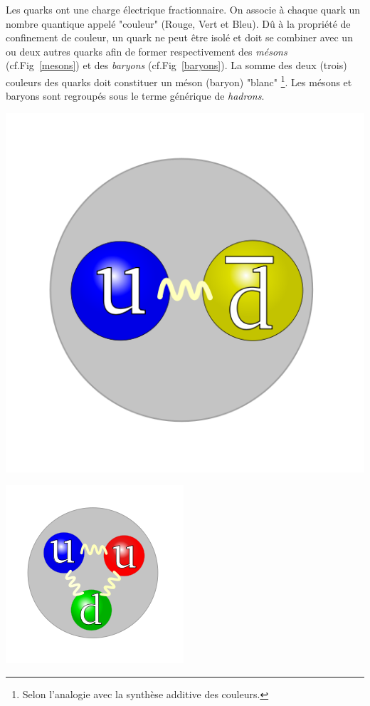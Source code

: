 Les quarks ont une charge électrique fractionnaire. On associe à chaque quark un nombre quantique appelé "couleur" (Rouge, Vert et Bleu). Dû à la propriété de confinement de couleur, un quark ne peut être isolé et doit se combiner avec un ou deux autres quarks afin de former respectivement des \textit{mésons} (cf.Fig~\ref{mesons}) et des \textit{baryons} (cf.Fig~\ref{baryons}). La somme des deux (trois) couleurs des quarks doit constituer un méson (baryon) "blanc" \footnote{Selon l'analogie avec la synthèse additive des couleurs.}. Les mésons et baryons sont regroupés sous le terme générique de \textit{hadrons}.

\marginpar
{
	\centering
	\includegraphics[width=\marginparwidth]{SM/quarks2.png}
	\label{mesons}
}

\marginpar
{
	\centering
    \includegraphics[width=\marginparwidth]{SM/quarks.png}
    \label{baryons}
}
	
